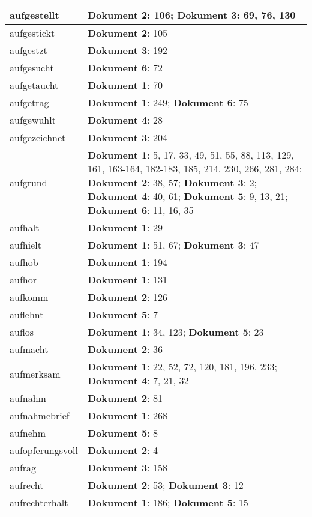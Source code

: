 \documentclass[a5paper]{article}
\begin{document}
\begin{longtable}[l]{|l|p{3in}|}
\hline
aufgestellt & \textbf{Dokument 2}: 106; \textbf{Dokument 3}: 69, 76, 130 \\
\hline
aufgestickt & \textbf{Dokument 2}: 105 \\
\hline
aufgestzt & \textbf{Dokument 3}: 192 \\
\hline
aufgesucht & \textbf{Dokument 6}: 72 \\
\hline
aufgetaucht & \textbf{Dokument 1}: 70 \\
\hline
aufgetrag & \textbf{Dokument 1}: 249; \textbf{Dokument 6}: 75 \\
\hline
aufgewuhlt & \textbf{Dokument 4}: 28 \\
\hline
aufgezeichnet & \textbf{Dokument 3}: 204 \\
\hline
aufgrund & \textbf{Dokument 1}: 5, 17, 33, 49, 51, 55, 88, 113, 129, 161, 163-164, 182-183, 185, 214, 230, 266, 281, 284; \textbf{Dokument 2}: 38, 57; \textbf{Dokument 3}: 2; \textbf{Dokument 4}: 40, 61; \textbf{Dokument 5}: 9, 13, 21; \textbf{Dokument 6}: 11, 16, 35 \\
\hline
aufhalt & \textbf{Dokument 1}: 29 \\
\hline
aufhielt & \textbf{Dokument 1}: 51, 67; \textbf{Dokument 3}: 47 \\
\hline
aufhob & \textbf{Dokument 1}: 194 \\
\hline
aufhor & \textbf{Dokument 1}: 131 \\
\hline
aufkomm & \textbf{Dokument 2}: 126 \\
\hline
auflehnt & \textbf{Dokument 5}: 7 \\
\hline
auflos & \textbf{Dokument 1}: 34, 123; \textbf{Dokument 5}: 23 \\
\hline
aufmacht & \textbf{Dokument 2}: 36 \\
\hline
aufmerksam & \textbf{Dokument 1}: 22, 52, 72, 120, 181, 196, 233; \textbf{Dokument 4}: 7, 21, 32 \\
\hline
aufnahm & \textbf{Dokument 2}: 81 \\
\hline
aufnahmebrief & \textbf{Dokument 1}: 268 \\
\hline
aufnehm & \textbf{Dokument 5}: 8 \\
\hline
aufopferungsvoll & \textbf{Dokument 2}: 4 \\
\hline
aufrag & \textbf{Dokument 3}: 158 \\
\hline
aufrecht & \textbf{Dokument 2}: 53; \textbf{Dokument 3}: 12 \\
\hline
aufrechterhalt & \textbf{Dokument 1}: 186; \textbf{Dokument 5}: 15 \\

\end{longtable}
\end{document}
